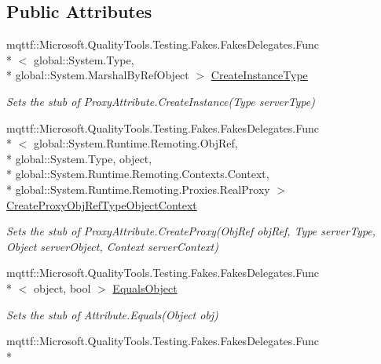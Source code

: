 \subsection*{Public Attributes}
\begin{DoxyCompactItemize}
\item 
mqttf\-::\-Microsoft.\-Quality\-Tools.\-Testing.\-Fakes.\-Fakes\-Delegates.\-Func\\*
$<$ global\-::\-System.\-Type, \\*
global\-::\-System.\-Marshal\-By\-Ref\-Object $>$ \hyperlink{class_system_1_1_runtime_1_1_remoting_1_1_proxies_1_1_fakes_1_1_stub_proxy_attribute_a78ab5768a271c685088897995c9c443f}{Create\-Instance\-Type}
\begin{DoxyCompactList}\small\item\em Sets the stub of Proxy\-Attribute.\-Create\-Instance(\-Type server\-Type)\end{DoxyCompactList}\item 
mqttf\-::\-Microsoft.\-Quality\-Tools.\-Testing.\-Fakes.\-Fakes\-Delegates.\-Func\\*
$<$ global\-::\-System.\-Runtime.\-Remoting.\-Obj\-Ref, \\*
global\-::\-System.\-Type, object, \\*
global\-::\-System.\-Runtime.\-Remoting.\-Contexts.\-Context, \\*
global\-::\-System.\-Runtime.\-Remoting.\-Proxies.\-Real\-Proxy $>$ \hyperlink{class_system_1_1_runtime_1_1_remoting_1_1_proxies_1_1_fakes_1_1_stub_proxy_attribute_a5efd073f9fdb442d3a54d7ef8a185d4a}{Create\-Proxy\-Obj\-Ref\-Type\-Object\-Context}
\begin{DoxyCompactList}\small\item\em Sets the stub of Proxy\-Attribute.\-Create\-Proxy(\-Obj\-Ref obj\-Ref, Type server\-Type, Object server\-Object, Context server\-Context)\end{DoxyCompactList}\item 
mqttf\-::\-Microsoft.\-Quality\-Tools.\-Testing.\-Fakes.\-Fakes\-Delegates.\-Func\\*
$<$ object, bool $>$ \hyperlink{class_system_1_1_runtime_1_1_remoting_1_1_proxies_1_1_fakes_1_1_stub_proxy_attribute_afd06137cdb5e18ea50458796830a48ee}{Equals\-Object}
\begin{DoxyCompactList}\small\item\em Sets the stub of Attribute.\-Equals(\-Object obj)\end{DoxyCompactList}\item 
mqttf\-::\-Microsoft.\-Quality\-Tools.\-Testing.\-Fakes.\-Fakes\-Delegates.\-Func\\*

\end{DoxyCompactItemize}
